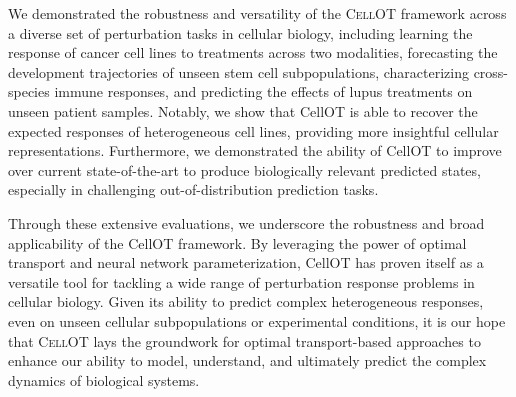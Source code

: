 
We demonstrated the robustness and versatility of the \textsc{CellOT} framework across a diverse set of perturbation tasks in cellular biology, including
learning the response of cancer cell lines to treatments across two modalities,
forecasting the development trajectories of unseen stem cell subpopulations, 
characterizing cross-species immune responses,
and predicting the effects of lupus treatments on unseen patient samples.
Notably, we show that CellOT is able to recover the expected responses of heterogeneous cell lines, providing more insightful cellular representations.
Furthermore, we demonstrated the ability of CellOT to improve over current state-of-the-art to produce biologically relevant predicted states, especially in challenging out-of-distribution prediction tasks.

Through these extensive evaluations, we underscore the robustness and broad applicability of the CellOT framework.
By leveraging the power of optimal transport and neural network parameterization, CellOT has proven itself as a versatile tool for tackling a wide range of perturbation response problems in cellular biology.
Given its ability to predict complex heterogeneous responses, even on unseen cellular subpopulations or experimental conditions,
it is our hope that \textsc{CellOT} lays the groundwork for optimal transport-based approaches to enhance our ability to model, understand, and ultimately predict the complex dynamics of biological systems.


